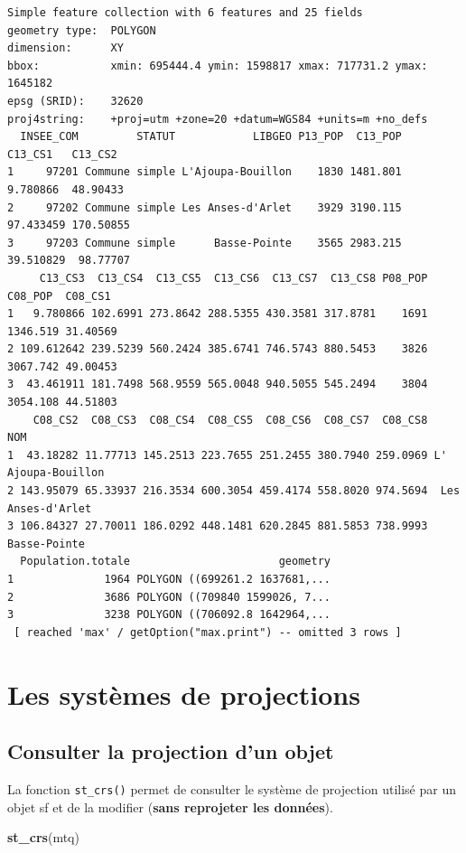 \documentclass[]{book}
\newenvironment{Shaded}{\begin{snugshade}}{\end{snugshade}}
\newcommand{\KeywordTok}[1]{\textcolor[rgb]{0.13,0.29,0.53}{\textbf{#1}}}
\newcommand{\NormalTok}[1]{#1}
\begin{document}
\begin{verbatim}
Simple feature collection with 6 features and 25 fields
geometry type:  POLYGON
dimension:      XY
bbox:           xmin: 695444.4 ymin: 1598817 xmax: 717731.2 ymax: 1645182
epsg (SRID):    32620
proj4string:    +proj=utm +zone=20 +datum=WGS84 +units=m +no_defs
  INSEE_COM         STATUT            LIBGEO P13_POP  C13_POP   C13_CS1   C13_CS2
1     97201 Commune simple L'Ajoupa-Bouillon    1830 1481.801  9.780866  48.90433
2     97202 Commune simple Les Anses-d'Arlet    3929 3190.115 97.433459 170.50855
3     97203 Commune simple      Basse-Pointe    3565 2983.215 39.510829  98.77707
     C13_CS3  C13_CS4  C13_CS5  C13_CS6  C13_CS7  C13_CS8 P08_POP  C08_POP  C08_CS1
1   9.780866 102.6991 273.8642 288.5355 430.3581 317.8781    1691 1346.519 31.40569
2 109.612642 239.5239 560.2424 385.6741 746.5743 880.5453    3826 3067.742 49.00453
3  43.461911 181.7498 568.9559 565.0048 940.5055 545.2494    3804 3054.108 44.51803
    C08_CS2  C08_CS3  C08_CS4  C08_CS5  C08_CS6  C08_CS7  C08_CS8                NOM
1  43.18282 11.77713 145.2513 223.7655 251.2455 380.7940 259.0969 L' Ajoupa-Bouillon
2 143.95079 65.33937 216.3534 600.3054 459.4174 558.8020 974.5694  Les Anses-d'Arlet
3 106.84327 27.70011 186.0292 448.1481 620.2845 881.5853 738.9993       Basse-Pointe
  Population.totale                       geometry
1              1964 POLYGON ((699261.2 1637681,...
2              3686 POLYGON ((709840 1599026, 7...
3              3238 POLYGON ((706092.8 1642964,...
 [ reached 'max' / getOption("max.print") -- omitted 3 rows ]
\end{verbatim}

\section{Les systèmes de projections}\label{les-systemes-de-projections}

\subsection{Consulter la projection d'un
objet}\label{consulter-la-projection-dun-objet}

La fonction \texttt{st\_crs()} permet de consulter le système de
projection utilisé par un objet sf et de la modifier (\textbf{sans
reprojeter les données}).

\begin{Shaded}
\begin{Highlighting}[]
\KeywordTok{st_crs}\NormalTok{(mtq)}
\end{Highlighting}
\end{Shaded}
\end{document}
